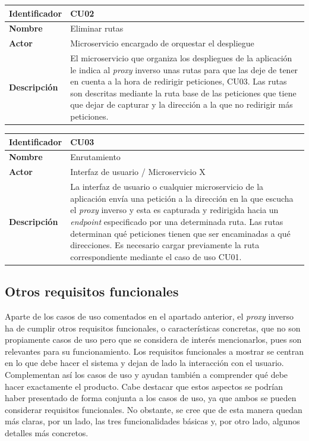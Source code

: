\documentclass[11pt,spanish,listoffigures]{tfgetsinf}
\begin{document}
\begin{center} \begin{tabular}{| l | p{11.3cm} |}
\hline
\textbf{Identificador} & CU02
\\ \hline
\textbf{Nombre} & Eliminar rutas
\\ \hline
\textbf{Actor} & Microservicio encargado de orquestar el despliegue
\\ \hline
\textbf{Descripción} & El microservicio que organiza los despliegues de la aplicación le indica al \emph{proxy} inverso unas rutas para que las deje de tener en cuenta a la hora de redirigir peticiones, CU03. Las rutas son descritas mediante la ruta base de las peticiones que tiene que dejar de capturar y la dirección a la que no redirigir más peticiones.
\\ \hline \end{tabular} \end{center}

\begin{center} \begin{tabular}{| l | p{11.3cm} |}
\hline
\textbf{Identificador} & CU03
\\ \hline
\textbf{Nombre} & Enrutamiento
\\ \hline
\textbf{Actor} & Interfaz de usuario / Microservicio X
\\ \hline
\textbf{Descripción} & La interfaz de usuario o cualquier microservicio de la aplicación envía una petición a la dirección en la que escucha el \emph{proxy} inverso y esta es capturada y redirigida hacia un \emph{endpoint} especificado por una determinada ruta. Las rutas determinan qué peticiones tienen que ser encaminadas a qué direcciones. Es necesario cargar previamente la ruta correspondiente mediante el caso de uso CU01.
\\ \hline \end{tabular} \end{center}


		\subsection{Otros requisitos funcionales} \label{requisitosFuncionales}

Aparte de los casos de uso comentados en el apartado anterior, el \emph{proxy} inverso ha de cumplir otros requisitos funcionales, o características concretas, que no son propiamente casos de uso pero que se considera de interés mencionarlos, pues son relevantes para su funcionamiento. Los requisitos funcionales a mostrar se centran en lo que debe hacer el sistema y dejan de lado la interacción con el usuario. Complementan así los casos de uso y ayudan también a comprender qué debe hacer exactamente el producto. Cabe destacar que estos aspectos se podrían haber presentado de forma conjunta a los casos de uso, ya que ambos se pueden considerar requisitos funcionales. No obstante, se cree que de esta manera quedan más claras, por un lado, las tres funcionalidades básicas y, por otro lado, algunos detalles más concretos.
\end{document}
